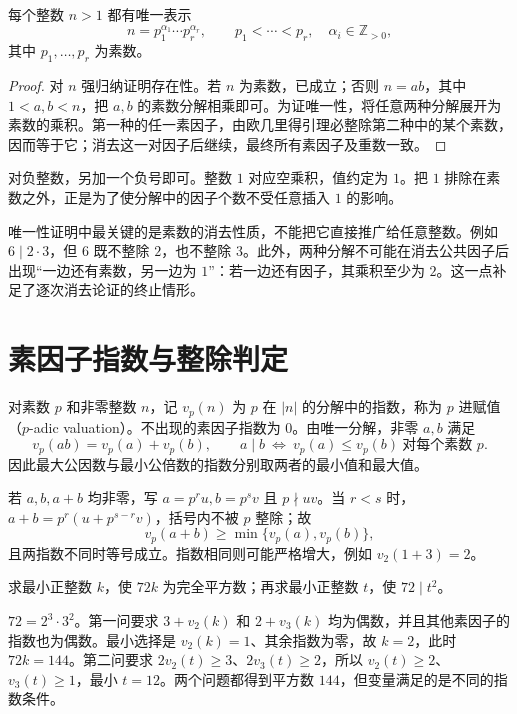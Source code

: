 \begin{theorem}
\label{thm:unique-factorization}
每个整数 $n>1$ 都有唯一表示
\begin{equation}
 n=p_1^{\alpha_1}\cdots p_r^{\alpha_r},\qquad
 p_1<\cdots<p_r,\quad \alpha_i\in\mathbb Z_{>0},
 \label{eq:prime-factorization}
\end{equation}
其中 $p_1,\ldots,p_r$ 为素数。
\end{theorem}
\begin{proof}
对 $n$ 强归纳证明存在性。若 $n$ 为素数，已成立；否则 $n=ab$，其中 $1<a,b<n$，把 $a,b$ 的素数分解相乘即可。为证唯一性，将任意两种分解展开为素数的乘积。第一种的任一素因子，由欧几里得引理必整除第二种中的某个素数，因而等于它；消去这一对因子后继续，最终所有素因子及重数一致。
\end{proof}

对负整数，另加一个负号即可。整数 $1$ 对应空乘积，值约定为 $1$。把 $1$ 排除在素数之外，正是为了使分解中的因子个数不受任意插入 $1$ 的影响。

唯一性证明中最关键的是素数的消去性质，不能把它直接推广给任意整数。例如 $6\mid2\cdot3$，但 $6$ 既不整除 $2$，也不整除 $3$。此外，两种分解不可能在消去公共因子后出现“一边还有素数，另一边为 $1$”：若一边还有因子，其乘积至少为 $2$。这一点补足了逐次消去论证的终止情形。

\section{素因子指数与整除判定}

对素数 $p$ 和非零整数 $n$，记 $v_p(n)$ 为 $p$ 在 $|n|$ 的分解中的指数，称为 $p$ 进赋值（$p$-adic valuation）。不出现的素因子指数为 $0$。由唯一分解，非零 $a,b$ 满足
\[
 v_p(ab)=v_p(a)+v_p(b),\qquad
 a\mid b\ \Longleftrightarrow\ v_p(a)\le v_p(b)\ \text{对每个素数 }p.
\]
因此最大公因数与最小公倍数的指数分别取两者的最小值和最大值。

若 $a,b,a+b$ 均非零，写 $a=p^ru,b=p^sv$ 且 $p\nmid uv$。当 $r<s$ 时，$a+b=p^r(u+p^{s-r}v)$，括号内不被 $p$ 整除；故
\[
 v_p(a+b)\ge\min\{v_p(a),v_p(b)\},
\]
且两指数不同时等号成立。指数相同则可能严格增大，例如 $v_2(1+3)=2$。

\begin{example}[把整除要求转化为指数要求]
求最小正整数 $k$，使 $72k$ 为完全平方数；再求最小正整数 $t$，使 $72\mid t^2$。
\end{example}
\begin{solve}
$72=2^3\cdot3^2$。第一问要求 $3+v_2(k)$ 和 $2+v_3(k)$ 均为偶数，并且其他素因子的指数也为偶数。最小选择是 $v_2(k)=1$、其余指数为零，故 $k=2$，此时 $72k=144$。第二问要求 $2v_2(t)\ge3$、$2v_3(t)\ge2$，所以 $v_2(t)\ge2$、$v_3(t)\ge1$，最小 $t=12$。两个问题都得到平方数 $144$，但变量满足的是不同的指数条件。
\end{solve}

